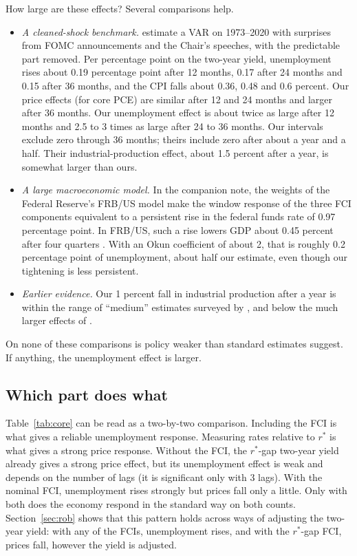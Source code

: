 \documentclass[11pt]{article}
\newcommand{\rs}{r^{*}}
\begin{document}
How large are these effects? Several comparisons help.
\begin{itemize}
\item \emph{A cleaned-shock benchmark.} \citet{bauer2023} estimate a VAR on 1973--2020 with surprises from FOMC announcements and the Chair's speeches, with the predictable part removed. Per percentage point on the two-year yield, unemployment rises about 0.19 percentage point after 12 months, 0.17 after 24 months and 0.15 after 36 months, and the CPI falls about 0.36, 0.48 and 0.6 percent. Our price effects (for core PCE) are similar after 12 and 24 months and larger after 36 months. Our unemployment effect is about twice as large after 12 months and 2.5 to 3 times as large after 24 to 36 months. Our intervals exclude zero through 36 months; theirs include zero after about a year and a half. Their industrial-production effect, about 1.5 percent after a year, is somewhat larger than ours.
\item \emph{A large macroeconomic model.} In the companion note, the weights of the Federal Reserve's FRB/US model make the window response of the three FCI components equivalent to a persistent rise in the federal funds rate of 0.97 percentage point. In FRB/US, such a rise lowers GDP about 0.45 percent after four quarters \citep{fcinote}. With an Okun coefficient of about 2, that is roughly 0.2 percentage point of unemployment, about half our estimate, even though our tightening is less persistent.
\item \emph{Earlier evidence.} Our 1 percent fall in industrial production after a year is within the range of ``medium'' estimates surveyed by \citet{coibion2012}, and below the much larger effects of \citet{romer2004}.
\end{itemize}
On none of these comparisons is policy weaker than standard estimates suggest. If anything, the unemployment effect is larger.

\subsection{Which part does what}\label{sec:parts}
Table~\ref{tab:core} can be read as a two-by-two comparison. Including the FCI is what gives a reliable unemployment response. Measuring rates relative to $\rs$ is what gives a strong price response. Without the FCI, the $\rs$-gap two-year yield already gives a strong price effect, but its unemployment effect is weak and depends on the number of lags (it is significant only with 3 lags). With the nominal FCI, unemployment rises strongly but prices fall only a little. Only with both does the economy respond in the standard way on both counts. Section~\ref{sec:rob} shows that this pattern holds across ways of adjusting the two-year yield: with any of the FCIs, unemployment rises, and with the $\rs$-gap FCI, prices fall, however the yield is adjusted.
\end{document}
